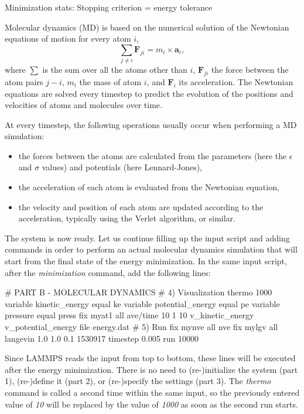 \begin{lcverbatim}
Minimization stats:
Stopping criterion = energy tolerance
\end{lcverbatim}

\noindent \begin{tcolorbox}[colback=mylightblue!5!white,colframe=mylightblue!75!black,title=Background Information -- What is molecular dynamics?]
Molecular dynamics (MD) is based on the numerical solution of the Newtonian
equations of motion for every atom $i$,
$$\sum_{j \ne i} \boldsymbol{F}_{ji} = m_i \times \boldsymbol{a}_i,$$
where $\sum$ is the sum over all the atoms other than $i$, 
$\boldsymbol{F}_{ji}$ the force between the atom pairs $j-i$,
$m_i$ the mass of atom $i$, and $\boldsymbol{F}_i$ its acceleration. 
The Newtonian equations are solved every timestep to predict the
evolution of the positions and velocities of atoms and molecules over time. 

At every timestep, the following operations usually occur when 
performing a MD simulation:
\begin{itemize}
\item the forces between the atoms are calculated from the parameters (here the $\epsilon$ and $\sigma$ values) and potentials (here Lennard-Jones),
\item the acceleration of each atom is evaluated from the Newtonian equation,
\item the velocity and position of each atom are updated according to the acceleration, typically using the Verlet algorithm, or similar.
\end{itemize}
\end{tcolorbox}

The system is now ready. Let us continue filling up the
input script and adding commands in order to perform an actual molecular dynamics
simulation that will start from the final state of the energy minimization.
In the same input script, after the \textit{minimization} command, add the following
lines:

\begin{lcverbatim}
# PART B - MOLECULAR DYNAMICS
# 4) Visualization
thermo 1000
variable kinetic_energy equal ke
variable potential_energy equal pe
variable pressure equal press
fix myat1 all ave/time 10 1 10 v_kinetic_energy v_potential_energy file energy.dat
# 5) Run
fix mynve all nve
fix mylgv all langevin 1.0 1.0 0.1 1530917
timestep 0.005
run 10000
\end{lcverbatim}

\noindent Since LAMMPS reads the input from top to
bottom, these lines will be executed after the energy
minimization. There is no need to (re-)initialize the system
(part 1), (re-)define it (part 2), or (re-)specify the settings
(part 3). The \textit{thermo} command is called a second time within the 
same input, so the previously entered value of \textit{10} will be replaced
by the value of \textit{1000} as soon as the second run starts.

